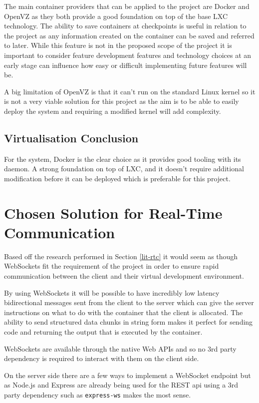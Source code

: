 The main container providers that can be applied to the project are Docker and OpenVZ as they both provide a good foundation on top of the base LXC technology. The ability to save containers at checkpoints is useful in relation to the project as any information created on the container can be saved and referred to later. While this feature is not in the proposed scope of the project it is important to consider feature development features and technology choices at an early stage can influence how easy or difficult implementing future features will be.

A big limitation of OpenVZ is that it can't run on the standard Linux kernel so it is not a very viable solution for this project as the aim is to be able to easily deploy the system and requiring a modified kernel will add complexity.

\subsection{Virtualisation Conclusion}

For the system, Docker is the clear choice as it provides good tooling with its daemon. A strong foundation on top of LXC, and it doesn't require additional modification before it can be deployed which is preferable for this project.

\section{Chosen Solution for Real-Time Communication} \label{solapp-rtc}

Based off the research performed in Section \ref{lit-rtc} it would seem as though WebSockets fit the requirement of the project in order to ensure rapid communication between the client and their virtual development environment.

By using WebSockets it will be possible to have incredibly low latency bidirectional messages sent from the client to the server which can give the server instructions on what to do with the container that the client is allocated. The ability to send structured data chunks in string form makes it perfect for sending code and returning the output that is executed by the container.

WebSockets are available through the native Web APIs and so no 3rd party dependency is required to interact with them on the client side.

On the server side there are a few ways to implement a WebSocket endpoint but as Node.js and Express are already being used for the REST api using a 3rd party dependency such as \texttt{express-ws} makes the most sense.

